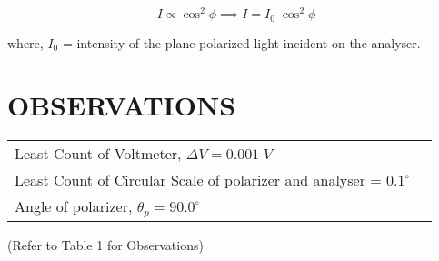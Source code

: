 \documentclass[11pt,a4paper]{article}
\begin{document}
\begin{equation}
I \varpropto \cos^{2}\phi \implies I = I_{0} \; \cos^{2}\phi
\end{equation}

where, $I_{0} $ =  intensity of the plane polarized light incident on the analyser.



\section*{OBSERVATIONS}
\begin{tabular}{l r}
Least Count of Voltmeter, $\Delta V = 0.001\; V $ \\
Least Count of Circular Scale of polarizer and analyser = $ 0.1^{\circ} $ \\
Angle of polarizer, $\theta_{p} = 90.0^{\circ} $
\end{tabular}

(Refer to Table 1 for Observations)

\end{document}
